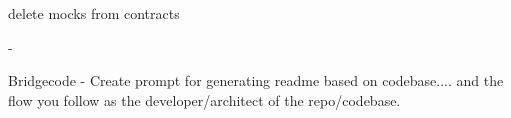 delete mocks from contracts


-


Bridgecode
    - Create prompt for generating readme based on codebase.... and the flow you follow as the developer/architect of the repo/codebase. 
